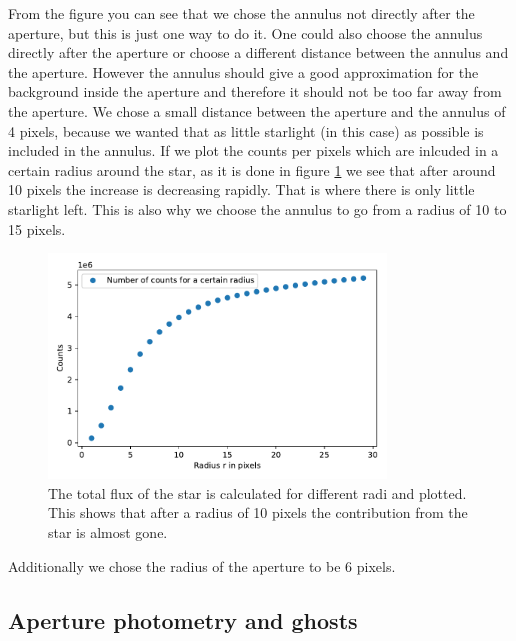 From the figure you can see that we chose the annulus not directly after the aperture, but this is just one way to do it. One could also choose the annulus directly after the aperture or choose a different distance between the annulus and the aperture. However the annulus should give a good approximation for the background inside the aperture and therefore it should not be too far away from the aperture. We chose a small distance between the aperture and the annulus of 4 pixels, because we wanted that as little starlight (in this case) as possible is included in the annulus. If we plot the counts per pixels which are inlcuded in a certain radius around the star, as it is done in figure \ref{fig:annulus_radi} we see that after around 10 pixels the increase is decreasing rapidly. That is where there is only little starlight left. This is also why we choose the annulus to go from a radius of 10 to 15 pixels. 
\begin{figure}[H]
	\centering
		\includegraphics[width=0.8\textwidth]{pics/CountsPerRadius.pdf}
		\caption{The total flux of the star is calculated for different radi and plotted. This shows that after a radius of 10 pixels the contribution from the star is almost gone.}
		\label{fig:annulus_radi}
\end{figure}
Additionally we chose the radius of the aperture to be 6 pixels.

\subsection{Aperture photometry and ghosts}

